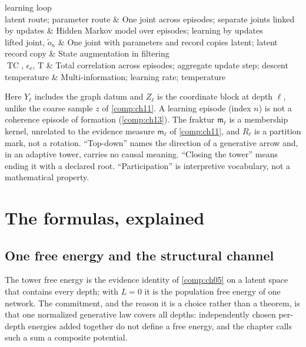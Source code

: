 \begin{decoder}
learning loop\\
latent route; parameter route & One joint across episodes; separate joints linked by updates & Hidden
Markov model over episodes; learning by updates\\
lifted joint, $\widetilde o_n$ & One joint with parameters and record copies latent; latent record copy
& State augmentation in filtering\\
$\operatorname{TC}$, $\epsilon_{\mathrm e}$, $\mathrm T$ & Total correlation across episodes; aggregate
update step; descent temperature & Multi-information; learning rate; temperature\\
\end{decoder}

Here $Y_\ell$ includes the graph datum and $Z_\ell$ is the coordinate block at depth $\ell$, unlike the
coarse sample $z$ of \cref{comp:ch11}. A learning episode (index $n$) is not a coherence episode of
formation (\cref{comp:ch13}). The fraktur $\mathfrak m_\ell$ is a membership kernel, unrelated to the
evidence measure $\mathsf m_\ell$ of \cref{comp:ch11}, and $R_\ell$ is a partition mark, not a rotation.
``Top-down'' names the direction of a generative arrow and, in an adaptive tower, carries no causal
meaning. ``Closing the tower'' means ending it with a declared root. ``Participation'' is interpretive
vocabulary, not a mathematical property.

\section{The formulas, explained}
\label{comp:ch12-formulas}

\subsection{One free energy and the structural channel}

The tower free energy is the evidence identity of \cref{comp:ch05} on a latent space that contains every
depth; with $L=0$ it is the population free energy of one network. The commitment, and the reason it is
a choice rather than a theorem, is that one normalized generative law covers all depths: independently
chosen per-depth energies added together do not define a free energy, and the chapter calls such a sum a
composite potential.

